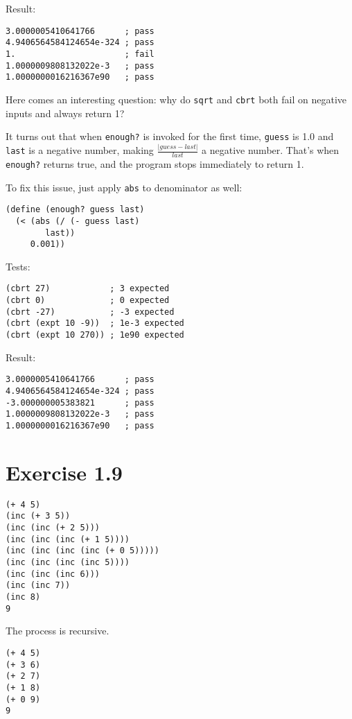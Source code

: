 \documentclass[../main.tex]{subfiles}
\begin{document}
Result:

\begin{lstlisting}
3.0000005410641766      ; pass
4.9406564584124654e-324 ; pass
1.                      ; fail
1.0000009808132022e-3   ; pass
1.0000000016216367e90   ; pass
\end{lstlisting}

Here comes an interesting question: why do
 \lstinline{sqrt} and \lstinline{cbrt}
 both fail on negative inputs and always
 return 1?

It turns out that when \lstinline{enough?} is invoked
 for the first time, \lstinline{guess} is 1.0 and
 \lstinline{last} is a negative number, making
 $\frac{|guess-last|}{last}$ a negative number. That's
 when \lstinline{enough?} returns true, and the
 program stops immediately to return 1.

To fix this issue, just apply \lstinline{abs} to
 denominator as well:

\begin{lstlisting}
(define (enough? guess last)
  (< (abs (/ (- guess last)
        last))
     0.001))
\end{lstlisting}

Tests:

\begin{lstlisting}
(cbrt 27)            ; 3 expected
(cbrt 0)             ; 0 expected
(cbrt -27)           ; -3 expected
(cbrt (expt 10 -9))  ; 1e-3 expected
(cbrt (expt 10 270)) ; 1e90 expected
\end{lstlisting}

Result:

\begin{lstlisting}
3.0000005410641766      ; pass
4.9406564584124654e-324 ; pass
-3.000000005383821      ; pass
1.0000009808132022e-3   ; pass
1.0000000016216367e90   ; pass
\end{lstlisting}

\section{Exercise 1.9}

\begin{lstlisting}
(+ 4 5)
(inc (+ 3 5))
(inc (inc (+ 2 5)))
(inc (inc (inc (+ 1 5))))
(inc (inc (inc (inc (+ 0 5)))))
(inc (inc (inc (inc 5))))
(inc (inc (inc 6)))
(inc (inc 7))
(inc 8)
9
\end{lstlisting}

The process is recursive.

\begin{lstlisting}
(+ 4 5)
(+ 3 6)
(+ 2 7)
(+ 1 8)
(+ 0 9)
9
\end{lstlisting}
\end{document}
